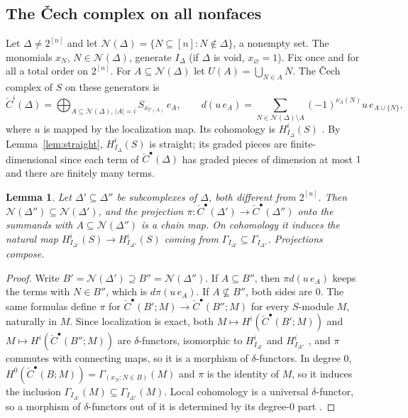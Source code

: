 \documentclass[11pt]{article}
\theoremstyle{plain}
\newtheorem{lemma}[theorem]{Lemma}
\theoremstyle{definition}
\newcommand{\Hloc}[2]{H^{#1}_{#2}}
\newcommand{\Nf}{\mathcal N}
\begin{document}
\subsection{The \v{C}ech complex on all nonfaces}

Let $\Delta\neq2^{[n]}$ and let $\Nf(\Delta)=\{N\subseteq[n]:N\notin\Delta\}$, a nonempty set. The monomials
$x_N$, $N\in\Nf(\Delta)$, generate $I_\Delta$ (if $\Delta$ is void, $x_\varnothing=1$). Fix once and for all a
total order on $2^{[n]}$. For $A\subseteq\Nf(\Delta)$ let $U(A)=\bigcup_{N\in A}N$. The \v{C}ech complex of
$S$ on these generators is
\[
\check C^i(\Delta)=\bigoplus_{A\subseteq\Nf(\Delta),\,|A|=i}S_{x_{U(A)}}\,e_A,\qquad
d(u\,e_A)=\sum_{N\in\Nf(\Delta)\setminus A}(-1)^{\nu_A(N)}u\,e_{A\cup\{N\}},
\]
where $u$ is mapped by the localization map. Its cohomology is $\Hloc{i}{I_\Delta}(S)$ \cite[\S3.5]{BrunsHerzog}.
By Lemma~\ref{lem:straight}, $\Hloc{i}{I_\Delta}(S)$ is straight; its graded pieces are finite-dimensional since
each term of $\check C^\bullet(\Delta)$ has graded pieces of dimension at most $1$ and there are finitely many
terms.

\begin{lemma}\label{lem:cech-maps}
Let $\Delta'\subseteq\Delta''$ be subcomplexes of $\Delta$, both different from $2^{[n]}$. Then
$\Nf(\Delta'')\subseteq\Nf(\Delta')$, and the projection $\pi\colon\check C^\bullet(\Delta')\to\check C^\bullet(\Delta'')$
onto the summands with $A\subseteq\Nf(\Delta'')$ is a chain map. On cohomology it induces the natural map
$\Hloc{i}{I_{\Delta'}}(S)\to\Hloc{i}{I_{\Delta''}}(S)$ coming from $\Gamma_{I_{\Delta'}}\subseteq\Gamma_{I_{\Delta''}}$.
Projections compose.
\end{lemma}

\begin{proof}
Write $B'=\Nf(\Delta')\supseteq B''=\Nf(\Delta'')$. If $A\subseteq B''$, then $\pi d(u\,e_A)$ keeps the terms with
$N\in B''$, which is $d\pi(u\,e_A)$. If $A\not\subseteq B''$, both sides are $0$. The same formulas define
$\pi$ for $\check C^\bullet(B';M)\to\check C^\bullet(B'';M)$ for every $S$-module $M$, naturally in $M$. Since
localization is exact, both $M\mapsto H^i(\check C^\bullet(B';M))$ and $M\mapsto H^i(\check C^\bullet(B'';M))$ are
$\delta$-functors, isomorphic to $\Hloc{i}{I_{\Delta'}}$ and $\Hloc{i}{I_{\Delta''}}$ \cite[\S3.5]{BrunsHerzog},
and $\pi$ commutes with connecting maps, so it is a morphism of $\delta$-functors. In degree $0$,
$H^0(\check C^\bullet(B;M))=\Gamma_{(x_N:N\in B)}(M)$ and $\pi$ is the identity of $M$, so it induces the
inclusion $\Gamma_{I_{\Delta'}}(M)\subseteq\Gamma_{I_{\Delta''}}(M)$. Local cohomology is a universal
$\delta$-functor, so a morphism of $\delta$-functors out of it is determined by its degree-$0$ part
\cite[\S2.1]{Weibel}.
\end{proof}
\end{document}
